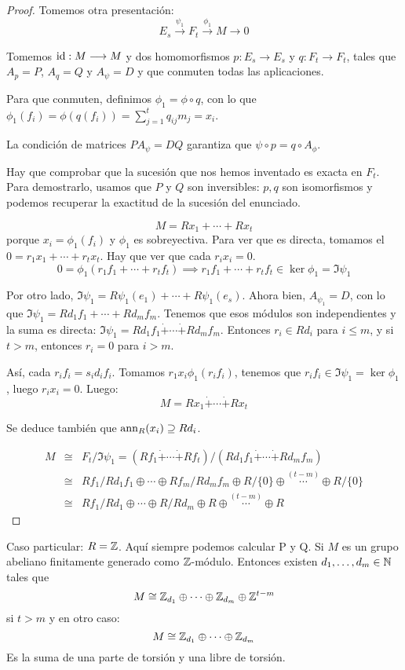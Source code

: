 \begin{proof}
  Tomemos otra presentación:
  \[
    E_s\overset{\psi_1}{\longrightarrow} F_t
    \overset{\phi_1}{\longrightarrow} M\longrightarrow 0
  \]

  Tomemos \(\operatorname{id}:M\longrightarrow M\) y dos homomorfismos
  \(p:E_s\longrightarrow E_s\) y
  \(q:F_t\longrightarrow F_t\), tales que \(A_p=P\),
  \(A_q=Q\) y \(A_\psi =D\) y que conmuten todas las aplicaciones.

  Para que conmuten, definimos \(\phi_1=\phi\circ q\),
  con lo que \(\phi_1(f_i)=\phi(q(f_i))=\sum_{j=1}^t q_{ij} m_j=x_i\).

  La condición de matrices \(PA_\psi=DQ\) garantiza que
  \(\psi\circ p=q\circ A_\phi\).

  Hay que comprobar que la sucesión que nos hemos inventado
  es exacta en \(F_t\). Para demostrarlo, usamos que \(P\) y \(Q\) son
  inversibles: \(p,q\) son isomorfismos y podemos recuperar la exactitud
  de la sucesión del enunciado.

  \[
    M=Rx_1+\cdots+Rx_t
  \]
  porque \(x_i=\phi_1(f_i)\) y \(\phi_1\) es sobreyectiva. Para ver que es
  directa, tomamos el \(0=r_1 x_1+\cdots+ r_t x_t\). Hay que ver
  que cada \(r_i x_i=0\).
  \[
    0=\phi_1(r_1 f_1+\cdots+r_t f_t)\implies
    r_1 f_1+\cdots+r_t f_t\in\ker\phi_1=\Im\psi_1
  \]

  Por otro lado, \(\Im\psi_1=R\psi_1(e_1)+\cdots+ R\psi_1(e_s)\).
  Ahora bien, \(A_{\psi_1}=D\), con lo que
  \(\Im\psi_1=Rd_1 f_1+\cdots +Rd_m f_m\). Tenemos que esos módulos
  son independientes y la suma es directa:
  \(\Im\psi_1=Rd_1 f_1\dot{+}\cdots\dot{+} Rd_m f_m\).
  Entonces \(r_i\in Rd_i\) para \(i\le m\),
  y si \(t>m\), entonces \(r_i=0\) para \(i>m\).

  Así, cada \(r_i f_i = s_i d_i f_i\).
  Tomamos \(r_1 x_i\phi_1(r_i f_i) \), tenemos que
  \(r_i f_i\in\Im\psi_1=\ker\phi_1\), luego \(r_i x_i=0\).
  Luego:
  \[
    M=Rx_1\dot{+}\cdots\dot{+}Rx_t
  \]

  Se deduce también que \(\operatorname{ann}_R(x_i)\supseteq Rd_i\).

  \begin{eqnarray*}
    M&\cong& F_t/\Im\psi_1=
    (Rf_1\dot{+}\cdots\dot{+}Rf_t)/
    (Rd_1f_1\dot{+}\cdots\dot{+}Rd_m f_m)\\
    &\cong&
    Rf_1/Rd_1 f_1\oplus\cdots\oplus Rf_m/Rd_m f_m
    \oplus R/\{0\}\oplus\overset{(t-m)}{\cdots}\oplus R/\{0\}\\
    &\cong&
    Rf_1/Rd_1\oplus\cdots\oplus R/Rd_m
    \oplus R\oplus\overset{(t-m)}{\cdots}\oplus R
  \end{eqnarray*}

\end{proof}

Caso particular: \(R=\mathbb{Z}\). Aquí siempre podemos calcular P y Q.
Si \(M\) es un grupo abeliano finitamente generado como \(\mathbb{Z}\)-módulo.
Entonces existen \(d_1,\ldots, d_m\in\mathbb{N}\) tales que
\[
  M\cong \mathbb{Z}_{d_1}\oplus\cdots\oplus\mathbb{Z}_{d_m}\oplus\mathbb{Z}^{t-m}
\]
si \(t>m\) y en otro caso:
\[
  M\cong \mathbb{Z}_{d_1}\oplus\cdots\oplus\mathbb{Z}_{d_m}
\]
Es la suma de una parte de torsión y una libre de torsión.

